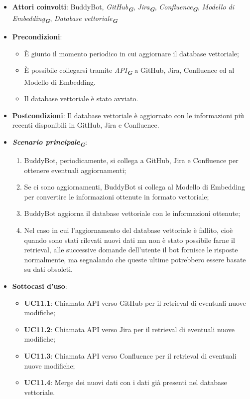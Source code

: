 \begin{itemize}
    \item \textbf{Attori coinvolti}: BuddyBot, \emph{GitHub}\textsubscript{\textbf{\textit{G}}}, \emph{Jira}\textsubscript{\textbf{\textit{G}}}, 
    \emph{Confluence}\textsubscript{\textbf{\textit{G}}}, \emph{Modello di Embedding}\textsubscript{\textbf{\textit{G}}}, 
    \emph{Database vettoriale}\textsubscript{\textbf{\textit{G}}}
    \item \textbf{Precondizioni}: 
    \begin{itemize}
        \item È giunto il momento periodico in cui aggiornare il database vettoriale;
        \item È possibile collegarsi tramite \emph{API}\textsubscript{\textbf{\textit{G}}} a GitHub, Jira, Confluence ed al Modello di Embedding.
        \item Il database vettoriale è stato avviato.
    \end{itemize}
    \item \textbf{Postcondizioni}: Il database vettoriale è aggiornato con le informazioni più recenti disponibili in GitHub, Jira e Confluence.
    \item \textbf{\emph{Scenario principale}\textsubscript{\textbf{\textit{G}}}}:
    \begin{enumerate}
        \item BuddyBot, periodicamente, si collega a GitHub, Jira e Confluence per ottenere eventuali aggiornamenti;
        \item Se ci sono aggiornamenti, BuddyBot si collega al Modello di Embedding per convertire le informazioni ottenute in formato vettoriale;
        \item BuddyBot aggiorna il database vettoriale con le informazioni ottenute;
        \item Nel caso in cui l'aggiornamento del database vettoriale è fallito, cioè quando sono stati rilevati nuovi dati ma non è stato possibile 
        farne il retrieval, alle successive domande dell'utente il bot fornisce le risposte normalmente, ma segnalando che queste ultime potrebbero 
        essere basate su dati obsoleti.
    \end{enumerate}
    \item \textbf{Sottocasi d'uso}:
    \begin{itemize}
        \item \textbf{UC11.1}: Chiamata API verso GitHub per il retrieval di eventuali nuove modifiche;
        \item \textbf{UC11.2}: Chiamata API verso Jira per il retrieval di eventuali nuove modifiche;
        \item \textbf{UC11.3}: Chiamata API verso Confluence per il retrieval di eventuali nuove modifiche;
        \item \textbf{UC11.4}: Merge dei nuovi dati con i dati già presenti nel database vettoriale.
    \end{itemize}
\end{itemize}



